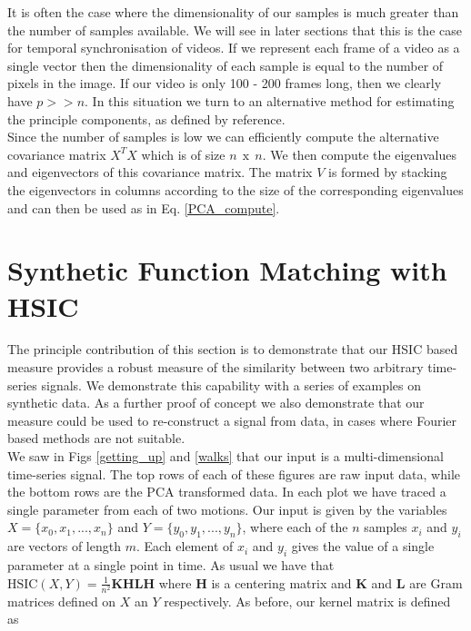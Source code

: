 It is often the case where the dimensionality of our samples is much greater than the number of samples available. We will see in later sections that this is the case for temporal synchronisation of videos. If we represent each frame of a video as a single vector then the dimensionality of each sample is equal to the number of pixels in the image. If our video is only 100 - 200 frames long, then we clearly have $p >> n$. In this situation we turn to an alternative method for estimating the principle components, as defined by reference. \\

Since the number of samples is low we can efficiently compute the alternative covariance matrix $X^{T} X$ which is of size $n\:\:\text{x}\:\:n$. We then compute the eigenvalues and eigenvectors of this covariance matrix. The matrix $V$ is formed by stacking the eigenvectors in columns according to the size of the corresponding eigenvalues and can then be used as in Eq. \ref{PCA_compute}.\\






















\section{Synthetic Function Matching with HSIC}

The principle contribution of this section is to demonstrate that our HSIC based measure provides a robust measure of the similarity between two arbitrary time-series signals. We demonstrate this capability with a series of examples on synthetic data. As a further proof of concept we also demonstrate that our measure could be used to re-construct a signal from data, in cases where Fourier based methods are not suitable. \\

We saw in Figs \ref{getting_up} and \ref{walks} that our input is a multi-dimensional time-series signal. The top rows of each of these figures are raw input data, while the bottom rows are the PCA transformed data. In each plot we have traced a single parameter from each of two motions. Our input is given by the variables $X = \{x_0, x_1, ..., x_n\}$ and $Y = \{y_0, y_1, ..., y_n\}$, where each of the $n$ samples $x_i$ and $y_i$ are vectors of length $m$. Each element of $x_i$ and $y_i$ gives the value of a single parameter at a single point in time. As usual we have that $\text{HSIC}(X, Y) = \frac{1}{n^2}\textbf{KHLH}$ where $\textbf{H}$ is a centering matrix and $\textbf{K}$ and $\textbf{L}$ are Gram matrices defined on $X$ an $Y$ respectively. As before, our kernel matrix is defined as


